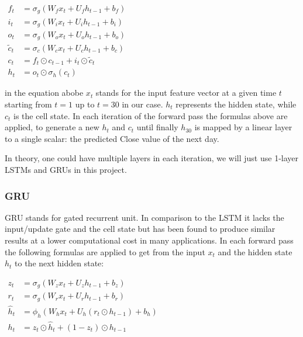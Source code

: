 \documentclass[utf8x]{ctexart}
\begin{document}
\begin{math}
  \begin{aligned}f_{t}            & =\sigma _{g}(W_{f}x_{t}+U_{f}h_{t-1}+b_{f})     \\
               i_{t}            & =\sigma _{g}(W_{i}x_{t}+U_{i}h_{t-1}+b_{i})     \\
               o_{t}            & =\sigma _{g}(W_{o}x_{t}+U_{o}h_{t-1}+b_{o})     \\
               {\tilde {c}}_{t} & =\sigma _{c}(W_{c}x_{t}+U_{c}h_{t-1}+b_{c})     \\
               c_{t}            & =f_{t}\odot c_{t-1}+i_{t}\odot {\tilde {c}}_{t} \\
               h_{t}            & =o_{t}\odot \sigma _{h}(c_{t})
  \end{aligned}
\end{math}

in the equation abobe $x_t$ stands for the input feature vector at a given time $t$ starting from $t = 1$ up to $t = 30$ in our case. $h_t$ represents the hidden state, while $c_t$ is the cell state. In each iteration of the forward pass the formulas above are applied, to generate a new $h_t$ and $c_t$ until finally $h_{30}$ is mapped by a linear layer to a single scalar: the predicted Close value of the next day.

In theory, one could have multiple layers in each iteration, we will just use 1-layer LSTMs and GRUs in this project.

\subsubsection{GRU}

GRU stands for gated recurrent unit. In comparison to the LSTM it lacks the input/update gate and the cell state but has been found to produce similar results at a lower computational cost in many applications. In each forward pass the following formulas are applied to get from the input $x_t$ and the hidden state $h_t$ to the next hidden state:


\begin{math}
  \begin{aligned}z_{t}          & =\sigma _{g}(W_{z}x_{t}+U_{z}h_{t-1}+b_{z})            \\
               r_{t}          & =\sigma _{g}(W_{r}x_{t}+U_{r}h_{t-1}+b_{r})            \\
               {\hat {h}}_{t} & =\phi _{h}(W_{h}x_{t}+U_{h}(r_{t}\odot h_{t-1})+b_{h}) \\
               h_{t}          & =z_{t}\odot {\hat {h}}_{t}+(1-z_{t})\odot h_{t-1}\end{aligned}
\end{math}
\end{document}
